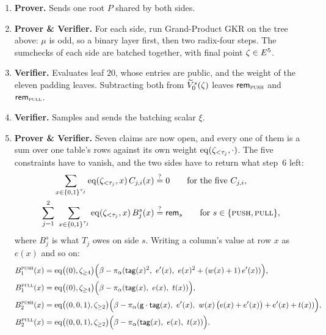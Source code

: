 \begin{enumerate}[itemsep=1pt,topsep=3pt]
\item \textbf{Prover.} Sends one root $P$ shared by both sides.
\item \textbf{Prover \& Verifier.} For each side, run Grand-Product GKR on the tree above: $\mu$ is odd, so a binary layer first, then two radix-four steps. The sumchecks of each side are batched together, with final point $\zeta\in E^{5}$.
\item \textbf{Verifier.} Evaluates leaf $20$, whose entries are public, and the weight of the eleven padding leaves. Subtracting both from $\widetilde{V}^{s}_0(\zeta)$ leaves $\mathsf{rem}_{\textsc{push}}$ and $\mathsf{rem}_{\textsc{pull}}$.
\item \textbf{Verifier.} Samples and sends the batching scalar $\xi$.
\item \textbf{Prover \& Verifier.} Seven claims are now open, and every one of them is a sum over one table's rows against its own weight $\operatorname{eq}(\zeta_{<\tau_j},\cdot)$. The five constraints have to vanish, and the two sides have to return what step~6 left:
\begin{align*}
  \sum_{x\in\cube{\tau_j}}\eq(\zeta_{<\tau_j},x)\,C_{j,i}(x)&\qeq0 \qquad\text{for the five } C_{j,i},\\
  \sum_{j=1}^{2}\ \sum_{x\in\cube{\tau_j}}\eq(\zeta_{<\tau_j},x)\,B^{s}_{j}(x)&\qeq\mathsf{rem}_{s} \qquad\text{for } s\in\{\push,\pull\},
\end{align*}
where $B^{s}_{j}$ is what $T_j$ owes on side $s$. Writing a column's value at row $x$ as $e(x)$ and so on:
\begin{align*}
  B^{\push}_{1}(x)&=\eq\bigl((0),\zeta_{\ge4}\bigr)\Bigl(\beta-\pi_\alpha\tup{\mathsf{tag}(x)^{2},\ e'(x),\ e(x)^{2}+(w(x)+1)\,e'(x)}\Bigr),\\
  B^{\pull}_{1}(x)&=\eq\bigl((0),\zeta_{\ge4}\bigr)\Bigl(\beta-\pi_\alpha\tup{\mathsf{tag}(x),\ e(x),\ t(x)}\Bigr),\\
  B^{\push}_{2}(x)&=\eq\bigl((0,0,1),\zeta_{\ge2}\bigr)\Bigl(\beta-\pi_\alpha\tup{\gen\cdot\mathsf{tag}(x),\ e'(x),\ w(x)\,\bigl(e(x)+e'(x)\bigr)+e'(x)+t(x)}\Bigr),\\
  B^{\pull}_{2}(x)&=\eq\bigl((0,0,1),\zeta_{\ge2}\bigr)\Bigl(\beta-\pi_\alpha\tup{\mathsf{tag}(x),\ e(x),\ t(x)}\Bigr).
\end{align*}


\end{enumerate}
